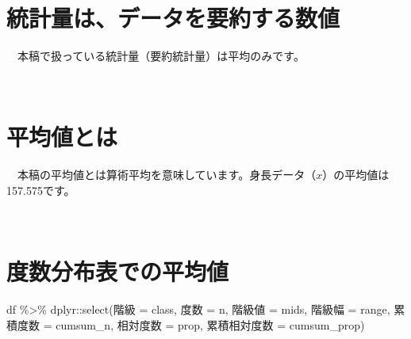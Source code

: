 \documentclass[
  12pt,
]{book}
\newenvironment{Shaded}{\begin{snugshade}}{\end{snugshade}}
\newcommand{\AttributeTok}[1]{\textcolor[rgb]{0.77,0.63,0.00}{#1}}
\newcommand{\FunctionTok}[1]{\textcolor[rgb]{0.00,0.00,0.00}{#1}}
\newcommand{\NormalTok}[1]{#1}
\newcommand{\OtherTok}[1]{\textcolor[rgb]{0.56,0.35,0.01}{#1}}
\newcommand{\SpecialCharTok}[1]{\textcolor[rgb]{0.00,0.00,0.00}{#1}}
\newcommand{\StringTok}[1]{\textcolor[rgb]{0.31,0.60,0.02}{#1}}
\begin{document}
　

\hypertarget{ux7d71ux8a08ux91cfux306fux30c7ux30fcux30bfux3092ux8981ux7d04ux3059ux308bux6570ux5024}{%
\section{統計量は、データを要約する数値}\label{ux7d71ux8a08ux91cfux306fux30c7ux30fcux30bfux3092ux8981ux7d04ux3059ux308bux6570ux5024}}

　本稿で扱っている統計量（要約統計量）は平均のみです。

　

\hypertarget{ux5e73ux5747ux5024ux3068ux306f}{%
\section{平均値とは}\label{ux5e73ux5747ux5024ux3068ux306f}}

　本稿の平均値とは算術平均を意味しています。身長データ（\(x\)）の平均値は157.575です。

　

\hypertarget{ux5ea6ux6570ux5206ux5e03ux8868ux3067ux306eux5e73ux5747ux5024}{%
\section{度数分布表での平均値}\label{ux5ea6ux6570ux5206ux5e03ux8868ux3067ux306eux5e73ux5747ux5024}}

\begin{Shaded}
\begin{Highlighting}[]
\NormalTok{df }\SpecialCharTok{\%\textgreater{}\%} 
\NormalTok{  dplyr}\SpecialCharTok{::}\FunctionTok{select}\NormalTok{(}\StringTok{\textasciigrave{}}\AttributeTok{階級}\StringTok{\textasciigrave{}} \OtherTok{=}\NormalTok{ class, }\StringTok{\textasciigrave{}}\AttributeTok{度数}\StringTok{\textasciigrave{}} \OtherTok{=}\NormalTok{ n, }\StringTok{\textasciigrave{}}\AttributeTok{階級値}\StringTok{\textasciigrave{}} \OtherTok{=}\NormalTok{ mids, }\StringTok{\textasciigrave{}}\AttributeTok{階級幅}\StringTok{\textasciigrave{}} \OtherTok{=}\NormalTok{ range,}
                \StringTok{\textasciigrave{}}\AttributeTok{累積度数}\StringTok{\textasciigrave{}} \OtherTok{=}\NormalTok{ cumsum\_n, }\StringTok{\textasciigrave{}}\AttributeTok{相対度数}\StringTok{\textasciigrave{}} \OtherTok{=}\NormalTok{ prop, }\StringTok{\textasciigrave{}}\AttributeTok{累積相対度数}\StringTok{\textasciigrave{}} \OtherTok{=}\NormalTok{ cumsum\_prop)}
\end{Highlighting}
\end{Shaded}
\end{document}
